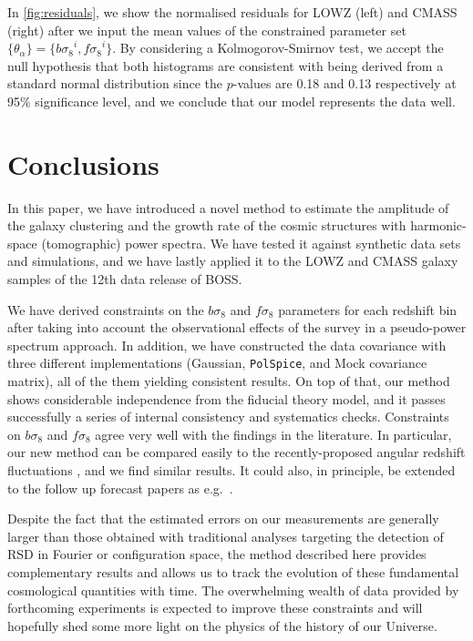 \documentclass[astrosymb,twocolumn]{aastex631}
\newcommand{\bs}{\ensuremath{b\sigma_8}}
\renewcommand{\fs}{\ensuremath{f\!\sigma_8}}
\begin{document}
In \autoref{fig:residuals}, we show the normalised residuals for LOWZ (left) and CMASS (right) after we input the mean values of the constrained parameter set \({\{\theta_\alpha\}}=\{\bs^i,\fs^i\}\). By considering a Kolmogorov-Smirnov test, we accept the null hypothesis that both histograms are consistent with being derived from a standard normal distribution since the \(p\)-values are 0.18 and 0.13 respectively at 95\% significance level, and we conclude that our model represents the data well.

\section{Conclusions}
\label{sec:conclusion}
In this paper, we have introduced a novel method to estimate the amplitude of the galaxy clustering and the growth rate of the cosmic structures with harmonic-space (tomographic) power spectra. We have tested it against synthetic data sets and simulations, and we have lastly applied it to the LOWZ and CMASS galaxy samples of the 12th data release of BOSS.

We have derived constraints on the $b\sigma_8$ and $f\sigma_8$ parameters for each redshift bin after taking into account the observational effects of the survey in a pseudo-power spectrum approach. In addition, we have constructed the data covariance with three different implementations (Gaussian, \texttt{PolSpice}, and Mock covariance matrix), all of the them yielding consistent results. On top of that, our method shows considerable independence from the fiducial theory model, and it passes successfully a series of internal consistency and systematics checks. Constraints on $b\sigma_8$ and  $f\sigma_8$ agree very well with the findings in the literature. In particular, our new method can be compared easily to the recently-proposed angular redshift fluctuations \citep{CHM2020}, and we find similar results. It could also, in principle, be extended to the follow up forecast papers as e.g.\ \citet{Fonseca_2019}.

Despite the fact that the estimated errors on our measurements are generally larger than those obtained with traditional analyses targeting the detection of RSD in Fourier or configuration space, the method described here provides complementary results and allows us to track the evolution of these fundamental cosmological quantities with time. The overwhelming wealth of data provided by forthcoming experiments is expected to improve these constraints and will hopefully shed some more light on the physics of the history of our Universe.
\end{document}
